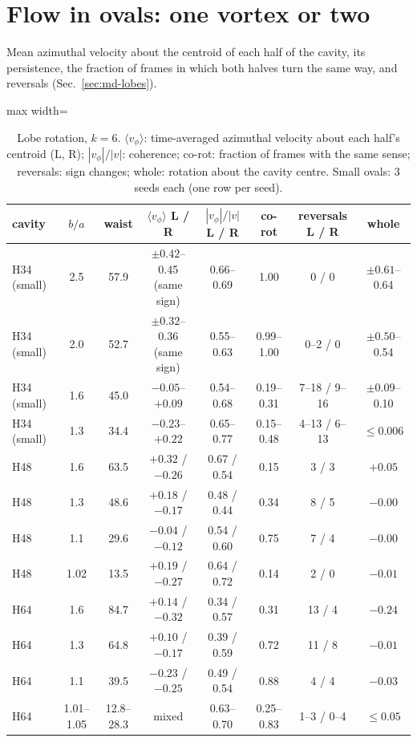 \section{Flow in ovals: one vortex or two}\label{sec:sflow}
Mean azimuthal velocity about the centroid of each half of the cavity, its persistence, the fraction of frames in which both
halves turn the same way, and reversals (Sec.~\ref{sec:md-lobes}).
\begin{table}[H]\centering\small
\caption{Lobe rotation, $k=6$. $\langle v_\phi\rangle$: time-averaged azimuthal velocity about each half's centroid (L, R);
$|v_\phi|/|v|$: coherence; co-rot: fraction of frames with the same sense; reversals: sign changes; whole: rotation about the cavity
centre. Small ovals: 3 seeds each (one row per seed).}\label{tab:lobes}
\begin{adjustbox}{max width=\textwidth}
\begin{tabular}{lccccccc}\toprule
cavity & $b/a$ & waist & $\langle v_\phi\rangle$ L / R & $|v_\phi|/|v|$ L / R & co-rot & reversals L / R & whole\\\midrule
H34 (small) & 2.5 & 57.9 & $\pm0.42$--0.45 (same sign) & 0.66--0.69 & 1.00 & 0 / 0 & $\pm0.61$--0.64\\
H34 (small) & 2.0 & 52.7 & $\pm0.32$--0.36 (same sign) & 0.55--0.63 & 0.99--1.00 & 0--2 / 0 & $\pm0.50$--0.54\\
H34 (small) & 1.6 & 45.0 & $-0.05$--$+0.09$ & 0.54--0.68 & 0.19--0.31 & 7--18 / 9--16 & $\pm0.09$--0.10\\
H34 (small) & 1.3 & 34.4 & $-0.23$--$+0.22$ & 0.65--0.77 & 0.15--0.48 & 4--13 / 6--13 & $\le0.006$\\
H48 & 1.6 & 63.5 & $+0.32$ / $-0.26$ & 0.67 / 0.54 & 0.15 & 3 / 3 & $+0.05$\\
H48 & 1.3 & 48.6 & $+0.18$ / $-0.17$ & 0.48 / 0.44 & 0.34 & 8 / 5 & $-0.00$\\
H48 & 1.1 & 29.6 & $-0.04$ / $-0.12$ & 0.54 / 0.60 & 0.75 & 7 / 4 & $-0.00$\\
H48 & 1.02 & 13.5 & $+0.19$ / $-0.27$ & 0.64 / 0.72 & 0.14 & 2 / 0 & $-0.01$\\
H64 & 1.6 & 84.7 & $+0.14$ / $-0.32$ & 0.34 / 0.57 & 0.31 & 13 / 4 & $-0.24$\\
H64 & 1.3 & 64.8 & $+0.10$ / $-0.17$ & 0.39 / 0.59 & 0.72 & 11 / 8 & $-0.01$\\
H64 & 1.1 & 39.5 & $-0.23$ / $-0.25$ & 0.49 / 0.54 & 0.88 & 4 / 4 & $-0.03$\\
H64 & 1.01--1.05 & 12.8--28.3 & mixed & 0.63--0.70 & 0.25--0.83 & 1--3 / 0--4 & $\le0.05$\\\bottomrule
\end{tabular}
\end{adjustbox}
\end{table}
